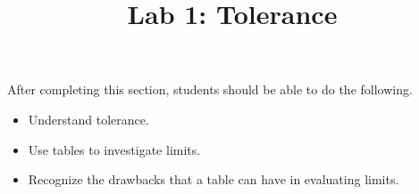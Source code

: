 \documentclass{ximera}
\title{Lab 1: Tolerance}
\begin{document}
\begin{abstract}
\end{abstract}

\maketitle

\begin{sectionOutcomes}

After completing this section, students should be able to do the following.

\begin{itemize}
	\item Understand tolerance.
    \item Use tables to investigate limits.
    \item Recognize the drawbacks that a table can have in evaluating limits.
\end{itemize}
\end{sectionOutcomes}
\end{document}
